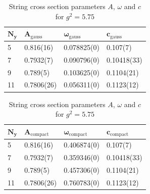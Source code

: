 \begin{table}[!hb]
\centering
\begin{tabular}{llll}
    $\mathbf{N_y}$ & $\mathbf{A_\mathrm{gauss}}$ & $\mathbf{\omega_\mathrm{gauss}}$ & $\mathbf{c_\mathrm{gauss}}$ \\ \hline
   5 & 0.816(16) & 0.078825(0) & 0.107(7) \\
   7 & 0.7932(7) & 0.090796(0) & 0.10418(33) \\
   9 & 0.789(5) & 0.103625(0) & 0.1104(21) \\
   11 & 0.7806(26) & 0.056311(0) & 0.1123(12) \\
\end{tabular}
\begin{tabular}{llll}
    $\mathbf{N_y}$ & $\mathbf{A_\mathrm{compact}}$ & $\mathbf{\omega_\mathrm{compact}}$ & $\mathbf{c_\mathrm{compact}}$ \\ \hline
   5 & 0.816(16) & 0.406874(0) & 0.107(7) \\
   7 & 0.7932(7) & 0.359346(0) & 0.10418(33) \\
   9 & 0.789(5) & 0.457306(0) & 0.1104(21) \\
   11 & 0.7806(26) & 0.760783(0) & 0.1123(12) \\
\end{tabular}
\caption{String cross section parameters $A$, $\omega$ and $c$ for $g^2=5.75$}
\end{table}
